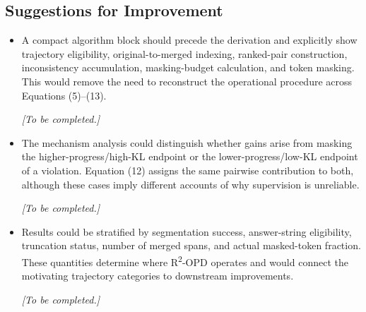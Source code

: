 \documentclass[11pt,a4paper]{article}
\begin{document}
\subsection*{Suggestions for Improvement}
\begin{itemize}
\item A compact algorithm block should precede the derivation and explicitly show trajectory eligibility, original-to-merged indexing, ranked-pair construction, inconsistency accumulation, masking-budget calculation, and token masking. This would remove the need to reconstruct the operational procedure across Equations (5)--(13).
\par{}
\begin{responsebox}[frametitle={Response to S1},nobreak=true]
\textit{[To be completed.]}\par\vspace{1em}
\end{responsebox}

\item The mechanism analysis could distinguish whether gains arise from masking the higher-progress/high-KL endpoint or the lower-progress/low-KL endpoint of a violation. Equation (12) assigns the same pairwise contribution to both, although these cases imply different accounts of why supervision is unreliable.
\par{}
\begin{responsebox}[frametitle={Response to S2},nobreak=true]
\textit{[To be completed.]}\par\vspace{1em}
\end{responsebox}

\item Results could be stratified by segmentation success, answer-string eligibility, truncation status, number of merged spans, and actual masked-token fraction. These quantities determine where R\textsuperscript{2}-OPD operates and would connect the motivating trajectory categories to downstream improvements.
\par{}
\begin{responsebox}[frametitle={Response to S3},nobreak=true]
\textit{[To be completed.]}\par\vspace{1em}
\end{responsebox}


\end{itemize}
\end{document}
